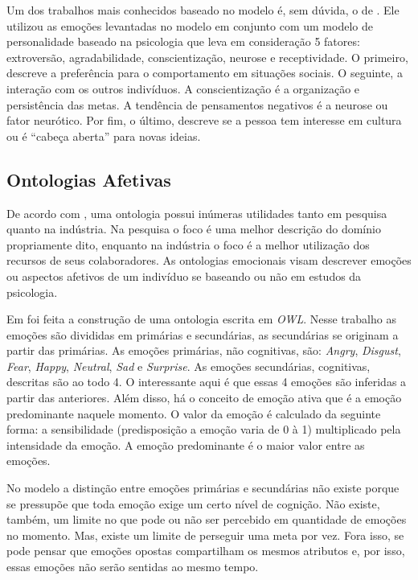 Um dos trabalhos mais conhecidos baseado no modelo \occ é, sem dúvida, o de
\citet{kshirsagar2002multilayer}. Ele utilizou
as emoções levantadas no modelo em conjunto com um modelo de personalidade
baseado na psicologia que leva em consideração 5 fatores: extroversão,
agradabilidade, conscientização, neurose e receptividade. O primeiro, descreve
a preferência para o comportamento em situações sociais. O seguinte, a
interação com os outros indivíduos. A conscientização é a organização e
persistência das metas. A tendência de pensamentos negativos é a neurose ou
fator neurótico. Por fim, o último, descreve se a pessoa tem interesse em
cultura ou é ``cabeça aberta'' para novas ideias.

\subsection{Ontologias Afetivas}

De acordo com \citet{Gutierrez:2007:OVH:1229160.1229164}, uma
ontologia possui inúmeras utilidades tanto em pesquisa quanto na
indústria. Na pesquisa o foco é uma melhor descrição do domínio propriamente
dito, enquanto na indústria o foco é a melhor utilização dos recursos de seus
colaboradores. As ontologias emocionais visam descrever emoções ou aspectos
afetivos de um indivíduo se baseando ou não em estudos da psicologia.

Em \citet{benta2007ontology} foi feita a construção de uma ontologia escrita em
\emph{OWL}. Nesse trabalho as emoções são divididas em primárias e secundárias, as
secundárias se originam a partir das primárias. As emoções primárias,
não cognitivas, são: \emph{Angry}, \emph{Disgust}, \emph{Fear},
\emph{Happy}, \emph{Neutral}, \emph{Sad} e \emph{Surprise}. As emoções
secundárias, cognitivas, descritas são ao todo 4. O interessante aqui é que
essas 4 emoções são inferidas a partir das anteriores. Além disso,
há o conceito de emoção ativa que é a emoção predominante naquele momento. O
valor da emoção é calculado da seguinte forma: a sensibilidade (predisposição
a emoção varia de 0 à 1) multiplicado pela intensidade da emoção. A emoção
predominante é o maior valor entre as emoções.

No modelo \occ a distinção entre emoções primárias e secundárias
não existe porque se pressupõe que toda emoção exige um certo nível de
cognição. Não existe, também, um limite no que pode ou não ser percebido em
quantidade de emoções no momento. Mas, existe um limite de perseguir uma meta por vez.
Fora isso, se pode pensar que emoções opostas compartilham os mesmos atributos
e, por isso, essas emoções não serão sentidas ao mesmo tempo.

